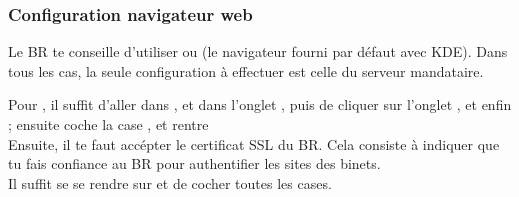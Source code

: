 %

\subsubsection{Configuration navigateur web}

 Le BR te conseille d'utiliser  ou
 (le navigateur fourni par d\'efaut avec KDE). Dans tous les cas, la seule
configuration \`a  effectuer est celle du serveur mandataire.

Pour , il suffit d'aller dans ,  et dans l'onglet , puis de cliquer sur l'onglet
, et enfin  ; ensuite coche la case , et rentre 
 \\
Ensuite, il te faut acc\'epter le certificat SSL du BR. Cela consiste \`a indiquer que tu fais confiance au BR pour authentifier les sites des binets.\\
Il suffit se se rendre sur  et de cocher toutes les cases.\\

